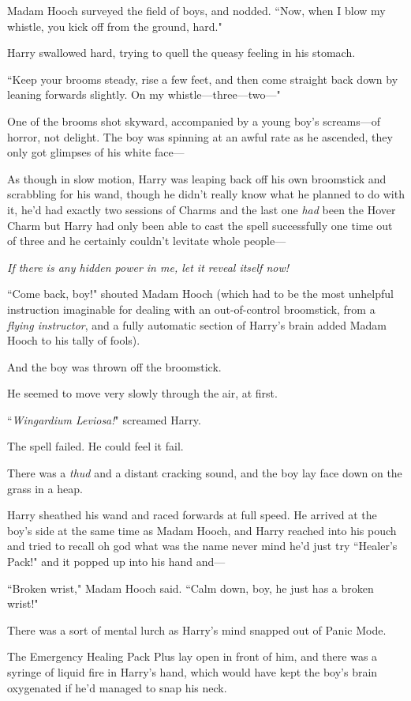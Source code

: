 Madam Hooch surveyed the field of boys, and nodded. ``Now, when I blow my whistle, you kick off from the ground, hard."

Harry swallowed hard, trying to quell the queasy feeling in his stomach.

``Keep your brooms steady, rise a few feet, and then come straight back down by leaning forwards slightly. On my whistle—three—two—"

One of the brooms shot skyward, accompanied by a young boy's screams—of horror, not delight. The boy was spinning at an awful rate as he ascended, they only got glimpses of his white face—

As though in slow motion, Harry was leaping back off his own broomstick and scrabbling for his wand, though he didn't really know what he planned to do with it, he'd had exactly two sessions of Charms and the last one \emph{had} been the Hover Charm but Harry had only been able to cast the spell successfully one time out of three and he certainly couldn't levitate whole people—

\emph{If there is any hidden power in me, let it reveal itself \emph{now}!}

``Come back, boy!" shouted Madam Hooch (which had to be the most unhelpful instruction imaginable for dealing with an out-of-control broomstick, from a \emph{flying instructor}, and a fully automatic section of Harry's brain added Madam Hooch to his tally of fools).

And the boy was thrown off the broomstick.

He seemed to move very slowly through the air, at first.

``\emph{Wingardium Leviosa!}" screamed Harry.

The spell failed. He could feel it fail.

There was a \emph{thud} and a distant cracking sound, and the boy lay face down on the grass in a heap.

Harry sheathed his wand and raced forwards at full speed. He arrived at the boy's side at the same time as Madam Hooch, and Harry reached into his pouch and tried to recall oh god what was the name never mind he'd just try ``Healer's Pack!" and it popped up into his hand and—

``Broken wrist," Madam Hooch said. ``Calm down, boy, he just has a broken wrist!"

There was a sort of mental lurch as Harry's mind snapped out of Panic Mode.

The Emergency Healing Pack Plus lay open in front of him, and there was a syringe of liquid fire in Harry's hand, which would have kept the boy's brain oxygenated if he'd managed to snap his neck.

